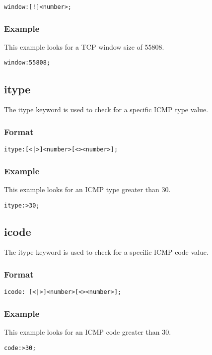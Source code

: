 \documentclass[english]{report}
\begin{document}
\begin{verbatim}
window:[!]<number>;
\end{verbatim}

\subsubsection{Example}
This example looks for a TCP window size of 55808.
\begin{verbatim}
window:55808;
\end{verbatim}

\subsection{itype}

The itype keyword is used to check for a specific ICMP type value.

\subsubsection{Format}

\begin{verbatim}
itype:[<|>]<number>[<><number>];
\end{verbatim}

\subsubsection{Example}

This example looks for an ICMP type greater than 30.
\begin{verbatim}
itype:>30;
\end{verbatim}

\subsection{icode}

The itype keyword is used to check for a specific ICMP code value.

\subsubsection{Format}
\begin{verbatim}
icode: [<|>]<number>[<><number>];
\end{verbatim}

\subsubsection{Example}
This example looks for an ICMP code greater than 30.
\begin{verbatim}
code:>30;
\end{verbatim}
\end{document}
